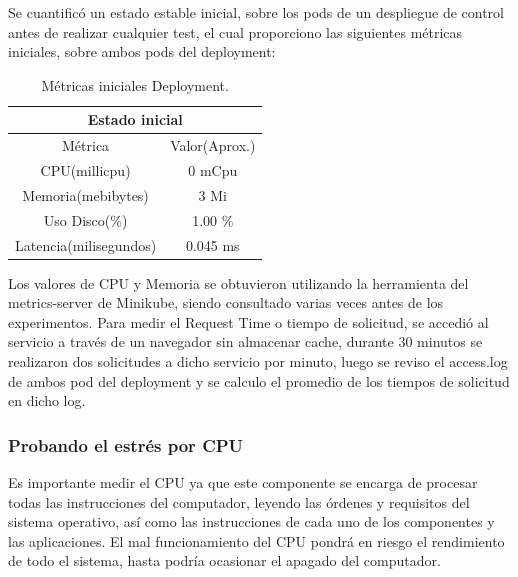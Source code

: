 \par Se cuantific\'o un estado estable inicial, sobre los pods de un despliegue de control antes de realizar cualquier test, el cual proporciono las siguientes métricas iniciales, sobre ambos pods del deployment:
\begin{table}[ht!]
\centering
\caption{Métricas iniciales Deployment.}
\vspace{0.5\baselineskip}
\begin{tabular}{|c|c|} 
 \hline
 \multicolumn{2}{|c|}{Estado inicial} \\
 \hline
 \hline
 Métrica & Valor(Aprox.)\\
 \hline
 CPU(millicpu) & 0 mCpu\\
 Memoria(mebibytes) & 3 Mi \\
 Uso Disco(\%) & 1.00 \% \\
 Latencia(milisegundos) & 0.045 ms\\
 \hline
\end{tabular}
\label{tab:tabla40}
\end{table}

\par Los valores de CPU y Memoria se obtuvieron utilizando la herramienta del metrics-server de Minikube, siendo consultado varias veces antes de los experimentos. Para medir el Request Time o tiempo de solicitud, se accedió al servicio a través de un navegador sin almacenar cache, durante 30 minutos se realizaron dos solicitudes a dicho servicio por minuto, luego se reviso el access.log de ambos pod del deployment y se calculo el promedio de los tiempos de solicitud en dicho log.


\subsubsection{Probando el estrés por CPU}


\par Es importante medir el CPU ya que este componente se encarga de procesar todas las instrucciones del computador, leyendo las órdenes y requisitos del sistema operativo, así como las instrucciones de cada uno de los componentes y las aplicaciones. El mal funcionamiento del CPU pondrá en riesgo el rendimiento de todo el sistema, hasta podría ocasionar el apagado del computador.\\

